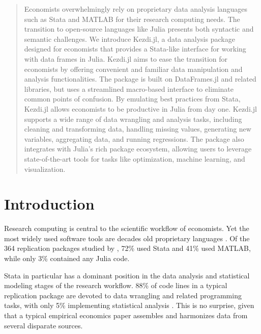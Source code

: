 \documentclass{juliacon}
\begin{document}

\maketitle

\begin{abstract}
	Economists overwhelmingly rely on proprietary data analysis languages such as Stata and MATLAB for their research computing needs. The transition to open-source languages like Julia presents both syntactic and semantic challenges. We introduce Kezdi.jl, a data analysis package designed for economists that provides a Stata-like interface for working with data frames in Julia. Kezdi.jl aims to ease the transition for economists by offering convenient and familiar data manipulation and analysis functionalities. The package is built on DataFrames.jl and related libraries, but uses a streamlined macro-based interface to eliminate common points of confusion. By emulating best practices from Stata, Kezdi.jl allows economists to be productive in Julia from day one. Kezdi.jl supports a wide range of data wrangling and analysis tasks, including cleaning and transforming data, handling missing values, generating new variables, aggregating data, and running regressions. The package also integrates with Julia's rich package ecosystem, allowing users to leverage state-of-the-art tools for tasks like optimization, machine learning, and visualization.
\end{abstract}

\section{Introduction}

Research computing is central to the scientific workflow of economists. Yet the most widely used software tools are decades old proprietary languages \citep{koren2022adoption}. Of the 364 replication packages studied by \citet{koren2023replication}, 72\% used Stata and 41\% used MATLAB, while only 3\% contained any Julia code.

Stata in particular has a dominant position in the data analysis and statistical modeling stages of the research workflow. 88\% of code lines in a typical replication package are devoted to data wrangling and related programming tasks, with only 5\% implementing statistical analysis \citep{koren2023share}. This is no surprise, given that a typical empirical economics paper assembles and harmonizes data from several disparate sources.
\end{document}
